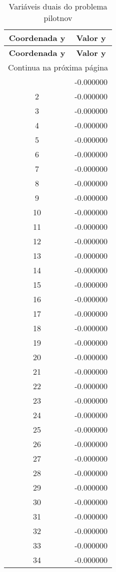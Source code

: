 \documentclass[12pt]{article}
\begin{document}
\begin{longtable}{@{}cc@{}}
\caption{Variáveis duais do problema pilotnov} \\
\toprule
\textbf{Coordenada y} & \textbf{Valor y} \\
\midrule
\endfirsthead

\toprule
\textbf{Coordenada y} & \textbf{Valor y} \\
\midrule
\endhead

\midrule \multicolumn{2}{r}{{Continua na próxima página}} \\ \midrule
\endfoot

\bottomrule
\endlastfoot
1 & -0.000000 \\
2 & -0.000000 \\
3 & -0.000000 \\
4 & -0.000000 \\
5 & -0.000000 \\
6 & -0.000000 \\
7 & -0.000000 \\
8 & -0.000000 \\
9 & -0.000000 \\
10 & -0.000000 \\
11 & -0.000000 \\
12 & -0.000000 \\
13 & -0.000000 \\
14 & -0.000000 \\
15 & -0.000000 \\
16 & -0.000000 \\
17 & -0.000000 \\
18 & -0.000000 \\
19 & -0.000000 \\
20 & -0.000000 \\
21 & -0.000000 \\
22 & -0.000000 \\
23 & -0.000000 \\
24 & -0.000000 \\
25 & -0.000000 \\
26 & -0.000000 \\
27 & -0.000000 \\
28 & -0.000000 \\
29 & -0.000000 \\
30 & -0.000000 \\
31 & -0.000000 \\
32 & -0.000000 \\
33 & -0.000000 \\
34 & -0.000000 \\

\end{longtable}
\end{document}
